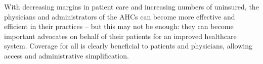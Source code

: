 \documentclass[12pt]{article}
\begin{document}
With decreasing margins in patient care and increasing numbers of uninsured, the physicians and administrators of the AHCs can become more effective and efficient in their practices – but this may not be enough: they can become important advocates on behalf of their patients for an improved healthcare system. Coverage for all is clearly beneficial to patients and physicians, allowing access and administrative simplification.
\end{document}
